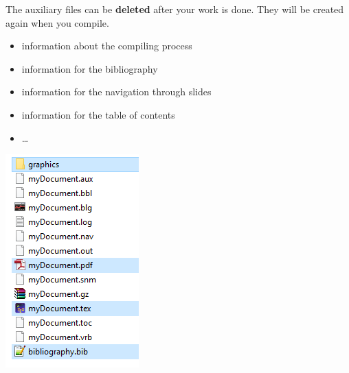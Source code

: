 \begin{frame}

\begin{minipage}{.58\textwidth}

The auxiliary files can be \textbf{deleted} after your work is done. They will be created again when you compile.

\begin{itemize}
	\item {} \ras information about the compiling process
	
	\item {} \ras information for the bibliography
	
	\item {} \ras information for the navigation through slides
	
	\item {} \ras information for the table of contents
		
	\item \dots 
\end{itemize}

\end{minipage}
%
\begin{minipage}{.40\textwidth}
	\centering
	\includegraphics[width=.9\linewidth]{../../texfiles-beamer/tex-material/WissArb-latex/latexDateien}
	

\end{minipage}
\end{frame}
